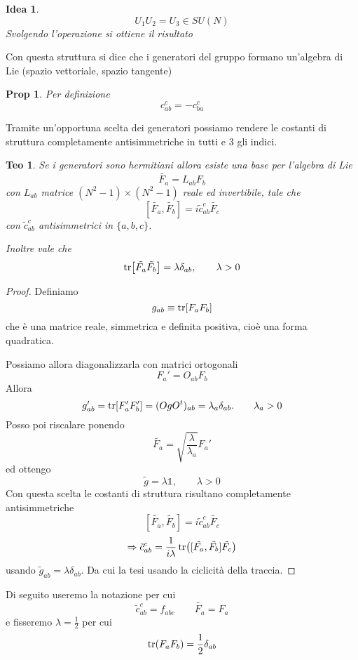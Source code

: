 \documentclass[10pt,a4paper]{article}
\newtheorem{thm}{Teo}[section]
\newtheorem{prop}{Prop}[section]
\newtheorem*{idea}{Idea}
\theoremstyle{definition}
\begin{document}
\begin{idea}
    \[
    U_1 U_2 = U_3 \in SU(N)    
    \]
    Svolgendo l'operazione si ottiene il risultato
\end{idea}
Con questa struttura si dice che i generatori del gruppo formano un'algebra di Lie (spazio vettoriale, spazio tangente)
\begin{prop}
    Per definizione 
    \[
    c_{ab}^c = -c_{ba}^c     
    \]
\end{prop}
Tramite un'opportuna scelta dei generatori possiamo rendere le costanti di struttura completamente antisimmetriche in tutti e 3 gli indici.

\begin{thm}
    Se i generatori sono hermitiani allora esiste una base per l'algebra di Lie 
    \[
    \tilde{F_a} = L_{ab} F_b     
    \]
    con $L_{ab}$ matrice $(N^2 - 1)\times(N^2 - 1)$ reale ed invertibile, tale che
    \[
    [\tilde{F_a}, \tilde{F_b}] = i \tilde{c}_{ab}^c \tilde{F_c}    
    \]
    con $\tilde{c}_{ab}^c$ antisimmetrici in $\{a, b, c\}$.
    
    Inoltre vale che
    \[
    \tr[\tilde{F_a}\tilde{F_b}] = \lambda \delta_{ab}, \qquad \lambda > 0     
    \]
\end{thm}

\begin{proof}
    Definiamo 
    \[
    g_{ab} \equiv \tr[F_a F_b]    
    \]
    che è una matrice reale, simmetrica e definita positiva, cioè una forma quadratica.

    Possiamo allora diagonalizzarla con matrici ortogonali
    \[
    F_a' = O_{ab} F_b    
    \]
    Allora 
    \[
    g_{ab}' = \tr [F_a' F_b'] = (O g O^t)_{ab} = \lambda_a \delta_{ab}. \qquad \lambda_a > 0     
    \]
    Posso poi riscalare ponendo
    \[
    \tilde{F_a} = \sqrt{\frac{\lambda}{\lambda_a}}F_a'    
    \]
    ed ottengo
    \[
    \tilde{g} = \lambda \mathbb{1}, \qquad \lambda > 0    
    \]
    Con questa scelta le costanti di struttura risultano completamente antisimmetriche
    \[
    [\tilde{F_a}, \tilde{F_b}] = i \tilde{c}_{ab}^c \tilde{F_c}    
    \]
    \[
    \Rightarrow \tilde{c}_{ab}^c = \frac{1}{i\lambda}\tr([\tilde{F_a}, \tilde{F_b}]\tilde{F_c})    
    \]
    usando $\tilde{g}_{ab} = \lambda \delta_{ab}$. Da cui la tesi usando la ciclicità della traccia.

\end{proof} 
Di seguito useremo la notazione per cui 
\[
    \tilde{c}_{ab}^c = f_{abc} \qquad \tilde{F_a} = F_a 
\]
e fisseremo $\lambda = \frac12$ per cui
\[
\tr(F_a F_b) = \frac12 \delta_{ab}    
\]
\end{document}
